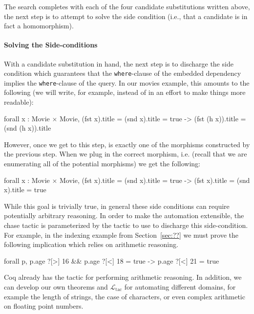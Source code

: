 \documentclass[preprint]{sigplanconf}
\newcommand{\ltac}[0]{\ensuremath{\mathcal{L}_{\mathrm{tac}}}}
\begin{document}
The search completes with each of the four candidate substitutions written above, the next step is to attempt to solve the side condition (i.e., that a candidate is in fact a homomorphism).

\paragraph{Solving the Side-conditions}
With a candidate substitution in hand, the next step is to discharge the side condition which guarantees that the {\tt where}-clause of the embedded dependency implies the {\tt where}-clause of the query.  In our movies example, this amounts to the following (we will write, for example,  instead of  in an effort to make things more readable):
\begin{coq}
forall x : Movie $\times$ Movie, (fst x).title = (snd x).title = true
     -> (fst (h x)).title = (snd (h x)).title
\end{coq}

However, once we get to this step,  is exactly one of the morphisms constructed by the previous step.
When we plug in the correct morphism, i.e.  (recall that we are enumerating all of the potential morphisms) we get the following:
\begin{coq}
forall x : Movie $\times$ Movie, (fst x).title = (snd x).title = true
     -> (fst x).title = (snd x).title = true
\end{coq}

While this goal is trivially true, in general these side conditions can require potentially arbitrary reasoning.
In order to make the automation extensible, the chase tactic is parameterized by the tactic to use to discharge this side-condition.
For example, in the indexing example from Section~\ref{sec:??} we must prove the following implication which relies on arithmetic reasoning.
\begin{coq}
forall p, p.age ?[>] 16 && p.age ?[<] 18 = true ->
          p.age ?[<] 21 = true
\end{coq}
Coq already has the  tactic for performing arithmetic reasoning.
In addition, we can develop our own theorems and \ltac{} for automating different domains, for example the length of strings, the case of characters, or even complex arithmetic on floating point numbers.
\end{document}
